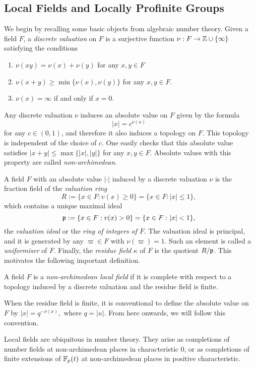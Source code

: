 

\subsection{Local Fields and Locally Profinite Groups}
We begin by recalling some basic objects from algebraic number theory. Given a field $F$, a \textit{discrete valuation} on $F$ is a surjective function $\nu: F\to\mathbb{Z}\cup\{\infty\}$ satisfying the conditions

\begin{enumerate}
    \item $\nu(xy)=\nu(x)+\nu(y)$ for any $x,y\in F$ 
    \item $\nu(x+y)\geq\min\{\nu(x),\nu(y)\}$ for any $x,y\in F$.
    \item $\nu(x)=\infty$ if and only if $x=0$.
\end{enumerate}

Any discrete valuation $\nu$ induces an absolute value on $F$ given by the formula 
$$|x|=c^{\nu(x)}$$ 
for any $c\in(0,1)$, and therefore it also induces a topology on $F$. This topology is independent of the choice of $c$. One easily checks that this absolute value satisfies $|x+y|\leq\max\{|x|,|y|\}$ for any $x,y\in F$. Absolute values with this property are called \textit{non-archimedean}. 

A field $F$ with an absolute value $|\cdot|$ induced by a discrete valuation $\nu$ is the fraction field of the \textit{valuation ring}
$$R:=\{x\in F:v(x)\geq 0\}=\{x\in F: |x|\leq1\},$$ 
which contains a unique maximal ideal
$$\mathfrak{p}:=\{x\in F:v(x)> 0\}=\{x\in F: |x|<1\},$$
the \textit{valuation ideal} or the \textit{ring of integers of $F$}. The valuation ideal is principal, and it is generated by any $\varpi\in F$ with $\nu(\varpi)=1$. Such an element is called a \textit{uniformiser} of $F$. Finally, the \textit{residue field} $\kappa$ of $F$ is the quotient $R/\mathfrak{p}$. This motivates the following important definition.

\begin{defn}
    A field $F$ is a \textit{non-archimedean local field} if it is complete with respect to a topology induced by a discrete valuation and the residue field is finite.
\end{defn}

\begin{rem}
    When the residue field is finite, it is conventional to define the absolute value on $F$ by 
    $|x|=q^{-\nu(x)},$
    where $q=|\kappa|$. From here onwards, we will follow this convention.
\end{rem}
\begin{rem}
    Local fields are ubiquitous in number theory. They arise as completions of number fields at non-archimedean places in characteristic 0, or as completions of finite extensions of $\mathbb{F}_p(t)$ at non-archimedean places in positive characteristic.
\end{rem}

